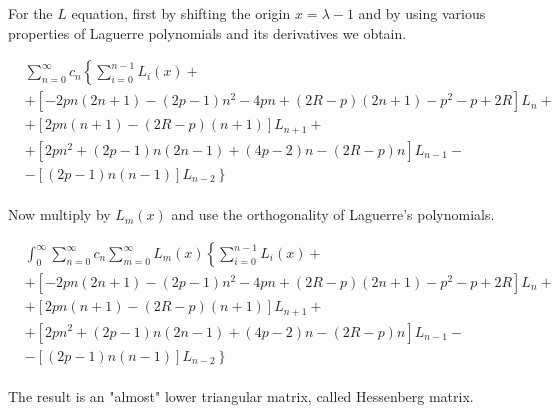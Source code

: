 For the $ L $ equation, first by shifting the origin $ x = \lambda -1 $ and by using various properties of Laguerre polynomials and its derivatives \cite{Laguerre1} we obtain.

\begin{equation}
\begin{split}
&  \sum_{n=0}^{\infty}c_n \left\{ \sum_{i = 0}^{n-1}{L_i(x)}  +  \right. \\[.8em] 
& + \left[ -2pn(2n+1) -(2p-1)n^2 -4pn +(2R-p)(2n+1) - p^2 -p + 2R \right]L_n + \\[.8em]
& + \left[2pn(n+1) - (2R-p)(n+1) \right]L_{n+1} + \\[.8em]
& + \left[2pn^2 + (2p-1)n(2n-1) + (4p-2)n - (2R-p)n \right]L_{n-1} - \\[.8em]
& \left. - \left[ (2p-1)n(n-1)  \right]L_{n-2}  \right\}
\end{split}
\end{equation}\\[1em]

Now multiply by $ L_m(x) $ and use the orthogonality of Laguerre's polynomials. 

\begin{equation}
\begin{split}
& \int_0^{\infty} \sum_{n=0}^{\infty}c_n \sum_{m=0}^{\infty}L_m(x) \left\{ \sum_{i = 0}^{n-1}{L_i(x)}  +  \right. \\[.8em] 
& + \left[ -2pn(2n+1) -(2p-1)n^2 -4pn +(2R-p)(2n+1) - p^2 -p + 2R \right]L_n + \\[.8em]
& + \left[2pn(n+1) - (2R-p)(n+1) \right]L_{n+1} + \\[.8em]
& + \left[2pn^2 + (2p-1)n(2n-1) + (4p-2)n - (2R-p)n \right]L_{n-1} - \\[.8em]
& \left. - \left[ (2p-1)n(n-1)  \right]L_{n-2}  \right\}
\end{split}
\end{equation}\\[1em]

The result is an "almost" lower triangular matrix, called Hessenberg matrix.

